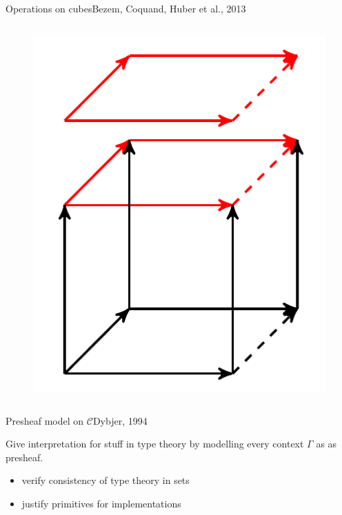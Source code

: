 \documentclass[english, draft]{beamer}
\begin{document}
\begin{frame}{Operations on cubes}{Bezem, Coquand, Huber et al., 2013}
\begin{columns}[c]
        \begin{figure}[h!]
                \includegraphics[height=.4\textheight]{figures/extension.png}
        \end{figure} 

        
\end{columns}
\end{frame}




\begin{frame}{Presheaf model on $\mathcal{C}$}{Dybjer, 1994}
 
 Give interpretation for stuff in type theory by modelling every context $\Gamma$ as as presheaf.
 
 

 
 \begin{itemize}
  \item verify consistency of type theory in sets
  \item justify primitives for implementations
 \end{itemize}
 


 
\end{frame}
\end{document}
